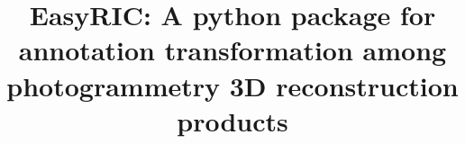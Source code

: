 \documentclass{configs/bmcart}
\begin{document}
\begin{frontmatter}

\begin{fmbox}


\title{EasyRIC: A python package for annotation transformation among photogrammetry 3D reconstruction products}


\author[
   addressref={aff1},
]{ }
\author[
   addressref={aff1},
   corref={aff1}, 
   email={guowei@g.ecc.u-tokyo.ac.jp}
]{ }


\address[id=aff1]{
  , 
  , 
}



\end{fmbox}
\end{frontmatter}
\end{document}
